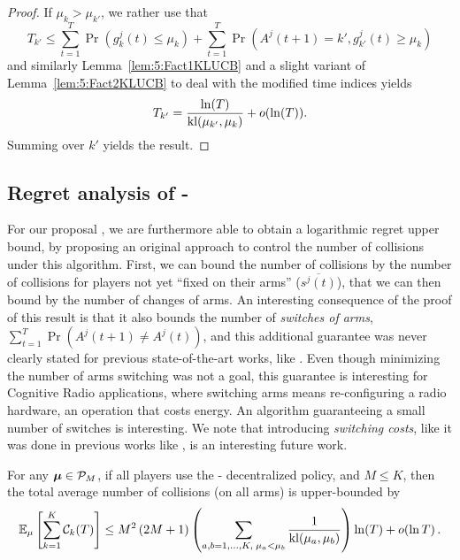 \begin{proof}
  If $\mu_k > \mu_{k'}$, we rather use that
  \[T_{k'} \leq \sum_{t=1}^T \Pr\left(g_{k}^j(t) \leq \mu_{k}\right) + \sum_{t=1}^T \Pr\left(A^j(t+1) = k', g_{k'}^j(t) \geq \mu_{k}\right)\]
  and similarly Lemma~\ref{lem:5:Fact1KLUCB} and a slight variant of Lemma~\ref{lem:5:Fact2KLUCB} to deal with the modified time indices yields
  \[T_{k'} = \frac{\ln(T)}{\mathrm{kl}(\mu_{k'},\mu_{k})} + o(\ln(T)).\]
  Summing over $k'$ yields the result.
\end{proof}


\subsection{Regret analysis of \MCTopM-\klUCB}\label{sub:5:UpperBoundCollisions}

For our proposal \MCTopM, we are furthermore able to obtain a logarithmic regret upper bound, by proposing an original approach to control the number of collisions under this algorithm.
First, we can bound the number of collisions by the number of collisions for players not yet ``fixed on their arms'' ($\overline{s^j(t)}$),
that we can then bound by the number of changes of arms.
%
An interesting consequence of the proof of this result is that
it also bounds the number of \emph{switches of arms}, $\sum_{t=1}^T \Pr(A^j(t+1) \neq A^j(t))$,
and this additional guarantee was never clearly stated for previous state-of-the-art works, like \rhoRand.
Even though minimizing the number of arms switching was not a goal,
this guarantee is interesting for Cognitive Radio applications,
where switching arms means re-configuring a radio hardware, an operation that costs energy.
An algorithm guaranteeing a small number of switches is interesting.
%
We note that introducing \emph{switching costs}, like it was done in previous works like \cite{Koren17}, is an interesting future work.

\begin{lemma}\label{lem:5:collisionsMCTopM}
  For any $\boldsymbol{\mu}\in\mathcal{P}_M$,
  if all players use the
  \MCTopM-\klUCB{} decentralized policy,
  and $M \leq K$,
  then the total average number of collisions (on all arms)
  is upper-bounded by
  \begin{equation}
    \mathbb{E}_{\mu}\left[\sum_{k=1}^K \mathcal{C}_k(T)\right]
    \leq M^2\left(2 M + 1\right) \left(\sum_{a,b=1,\dots,K,\;\mu_a < \mu_b} \frac{1}{\mathrm{kl}(\mu_a,\mu_b)}\right) \ln(T) + \mathop{}\mathopen{}o\mathopen{}\left(\ln T\right).
  \end{equation}
\end{lemma}

